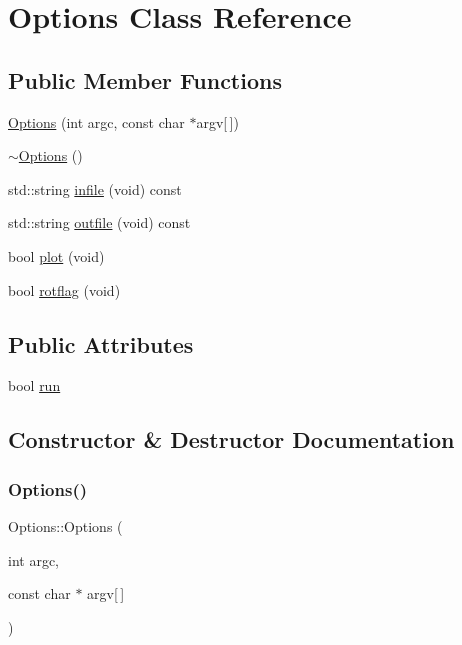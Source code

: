 \hypertarget{class_options}{}\section{Options Class Reference}
\label{class_options}
\subsection*{Public Member Functions}
\begin{DoxyCompactItemize}
\item 
\mbox{\hyperlink{class_options_af65f2f452a673db877590dbff53115ff}{Options}} (int argc, const char $\ast$argv\mbox{[}$\,$\mbox{]})
\item 
\mbox{\hyperlink{class_options_a86ddb85b183f8b58af5481f30a42fa92}{$\sim$\+Options}} ()
\item 
std\+::string \mbox{\hyperlink{class_options_af5fc0ecb4b117c5438f07762fa7f565a}{infile}} (void) const
\item 
std\+::string \mbox{\hyperlink{class_options_a35e8029289fef81902b98422e5b9aff8}{outfile}} (void) const
\item 
bool \mbox{\hyperlink{class_options_a6d00df300abbec9c39990eb8858f1255}{plot}} (void)
\item 
bool \mbox{\hyperlink{class_options_a896737c665d9c0ee7a17a0cdedf66bb7}{rotflag}} (void)
\end{DoxyCompactItemize}
\subsection*{Public Attributes}
\begin{DoxyCompactItemize}
\item 
bool \mbox{\hyperlink{class_options_a762a0775c9b60ceb2737dc90c96f7c0b}{run}}
\end{DoxyCompactItemize}


\subsection{Constructor \& Destructor Documentation}
\mbox{\label{class_options_af65f2f452a673db877590dbff53115ff}} 
\subsubsection{\texorpdfstring{Options()}{Options()}}
{\footnotesize\ttfamily Options\+::\+Options (\begin{DoxyParamCaption}\item[{int}]{argc,  }\item[{const char $\ast$}]{argv\mbox{[}$\,$\mbox{]} }\end{DoxyParamCaption})}

